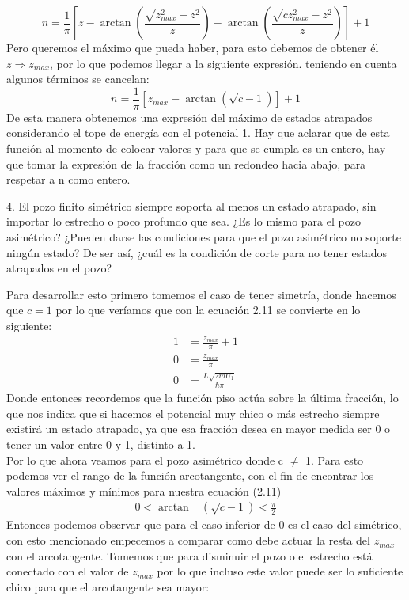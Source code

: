 \begin{equation}
    n = \frac{1}{\pi} [z-\arctan(\frac{\sqrt{z^2_{max}-z^2}}{z})-\arctan(\frac{\sqrt{cz^2_{max}-z^2}}{z})]+1
\end{equation}
Pero queremos el máximo que pueda haber, para esto debemos de obtener él $z \Rightarrow z_{max}$, por lo que podemos llegar a la siguiente expresión. teniendo en cuenta algunos términos se cancelan:
\begin{equation}
    \boxed{n = \frac{1}{\pi}[z_{max} -\arctan(\sqrt{c-1})]+1}
\end{equation}
De esta manera obtenemos una expresión del máximo de estados atrapados considerando el tope de energía con el potencial 1. Hay que aclarar que de esta función al momento de colocar valores y para que se cumpla es un entero, hay que tomar la expresión de la fracción como un redondeo hacia abajo, para respetar a n como entero.
\begin{pregunta}{4.}
El pozo finito simétrico siempre soporta al menos un estado atrapado, sin importar lo estrecho o poco profundo que sea. ¿Es lo mismo para el pozo asimétrico? ¿Pueden darse las condiciones para que el pozo asimétrico no soporte ningún estado? De ser así, ¿cuál es la condición de corte para no tener estados atrapados en el pozo?
\end{pregunta}
 Para desarrollar esto primero tomemos el caso de tener simetría, donde hacemos que $c = 1$ por lo que veríamos que con la ecuación 2.11 se convierte en lo siguiente:
 \begin{align*}
     1 &= \frac{z_{max}}{\pi} +1\\
     0 &= \frac{z_{max}}{\pi}\\
     0 &= \frac{L\sqrt{2mU_1}}{\hbar \pi}
 \end{align*}
 Donde entonces recordemos que la función piso actúa sobre la última fracción, lo que nos indica que si hacemos el potencial muy chico o más estrecho siempre existirá un estado atrapado, ya que esa fracción desea en mayor medida ser 0 o tener un valor entre 0 y 1, distinto a 1.\\
Por lo que ahora veamos para el pozo asimétrico donde c $\neq$ 1. Para esto podemos ver el rango de la función arcotangente, con el fin de encontrar los valores máximos y mínimos para nuestra ecuación (2.11)
\begin{align*}
    0 < \arctan&(\sqrt{c-1})<\frac{\pi}{2}
\end{align*}
Entonces podemos observar que para el caso inferior de 0 es el caso del simétrico, con esto mencionado empecemos a comparar como debe actuar la resta del $z_{max}$ con el arcotangente. Tomemos que para disminuir el pozo o el estrecho está conectado con el valor de $z_{max}$ por lo que incluso este valor puede ser lo suficiente chico para que el arcotangente sea mayor:
